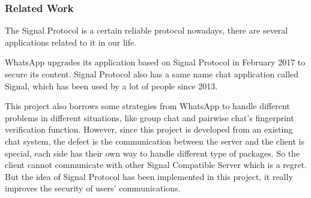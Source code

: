 \subsubsection{Related Work}
The Signal Protocol is a certain reliable protocol nowadays, there are several applications related to it in our life.

WhatsApp upgrades its application based on Signal Protocol in February 2017 to secure its content. Signal Protocol also has a same name chat application called Signal, which has been used by a lot of people since 2013.

 This project also borrows some strategies from WhatsApp to handle different problems in different situations, like group chat and pairwise chat's fingerprint verification function. However, since this project is developed from an existing chat system, the defect is the communication between the server and the client is special, each side has their own way to handle different type of packages. So the client cannot communicate with other Signal Compatible Server which is a regret. But the idea of Signal Protocol has been implemented in this project, it really improves the security of users' communications.

\clearpage